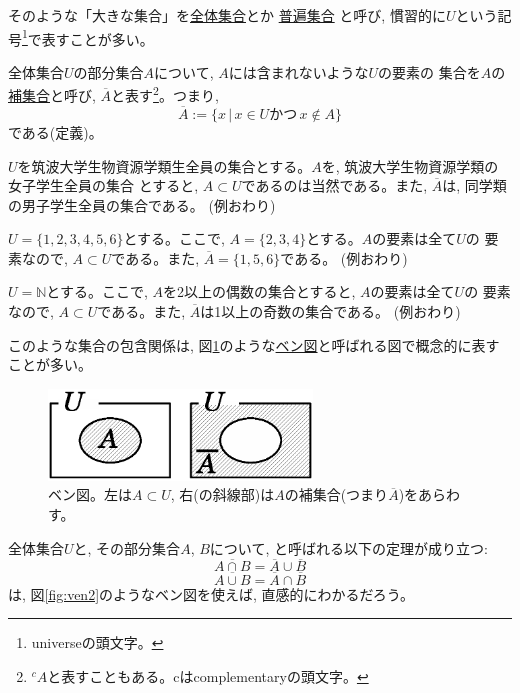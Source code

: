 そのような「大きな集合」を\underline{全体集合}とか
\underline{普遍集合}
と呼び, 慣習的に$U$という記号\footnote{universeの頭文字。}で表すことが多い。

全体集合$U$の部分集合$A$について, $A$には含まれないような$U$の要素の
集合を$A$の\underline{補集合}と呼び, 
$\overline{A}$と表す\footnote{$^cA$と表すこともある。cはcomplementaryの頭文字。}。つまり, 
\begin{equation}\overline{A}:=\{x\,|\, x\in U\text{かつ}\,x \notin A\}\end{equation}
である(定義)。\\

\begin{exmpl} $U$を筑波大学生物資源学類生全員の集合とする。$A$を, 筑波大学生物資源学類の女子学生全員の集合
とすると, $A\subset U$であるのは当然である。また, $\overline{A}$は, 同学類の男子学生全員の集合である。
(例おわり)\end{exmpl}
\mv

\begin{exmpl} $U=\{1, 2, 3, 4, 5, 6\}$とする。ここで, $A=\{2, 3, 4\}$とする。$A$の要素は全て$U$の
要素なので, $A\subset U$である。また, $\overline{A}=\{1, 5, 6\}$である。
(例おわり)\end{exmpl}
\mv

\begin{exmpl} $U=\mathbb{N}$とする。ここで, $A$を2以上の偶数の集合とすると, $A$の要素は全て$U$の
要素なので, $A\subset U$である。また, $\overline{A}$は1以上の奇数の集合である。
(例おわり)\end{exmpl}
\mv

このような集合の包含関係は, 図\ref{fig:ven1}のような\underline{ベン図}と呼ばれる図で概念的に表すことが多い。

\begin{figure}[ht]
    \centering
    \includegraphics[width=7cm]{ven1.eps}
    \caption{ベン図。左は$A\subset U$, 右(の斜線部)は$A$の補集合(つまり$\overline{A}$)をあらわす。\label{fig:ven1}}
\end{figure}


全体集合$U$と, その部分集合$A$, $B$について, 
と呼ばれる以下の定理が成り立つ:
\begin{equation}\overline{A\cap B}=\overline{A}\cup\overline{B}\label{eq:deMorgan1}\end{equation}
\begin{equation}\overline{A\cup B}=\overline{A}\cap\overline{B}\label{eq:deMorgan2}\end{equation}
は, 図\ref{fig:ven2}のようなベン図を使えば, 直感的にわかるだろう。

